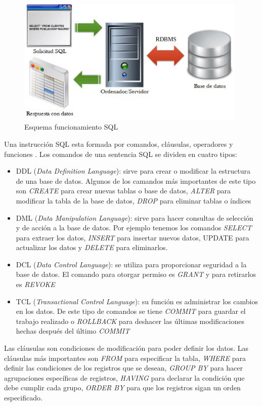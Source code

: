 \begin{figure}[H]
    \centering
    \includegraphics[width=11cm, keepaspectratio]{img/sql.png}
    \caption{Esquema funcionamiento SQL}
    \label{fig:sql}
\end{figure}
Una instrucción SQL esta formada por comandos, cláusulas, operadores y funciones . Los comandos de una sentencia SQL se dividen en cuatro tipos:
\begin{itemize}
\item DDL (\textit{Data Definition Language}): sirve para crear o modificar la estructura de una base de datos. Algunos de los camandos más importantes de este tipo son \textit{CREATE }para crear nuevas tablas o base de datos, \textit{ALTER} para modificar la tabla de la base de datos, \textit{DROP} para eliminar tablas o índices 
\item DML (\textit{Data Manipulation Language}): sirve para hacer consultas de selección y de acción a la base de datos. Por ejemplo tenemos los comandos \textit{SELECT} para extraer los datos,\textit{ INSERT} para insertar nuevos datos, UPDATE para actualizar los datos y \textit{DELETE} para eliminarlos.
\item DCL (\textit{Data Control Language}): se utiliza para proporcionar seguridad a la base de datos. El comando para otorgar permiso es \textit{GRANT} y para retirarlos es \textit{REVOKE}
\item TCL (\textit{Transactional Control Language}): su función es administrar los cambios en los datos. De este tipo de comandos se tiene \textit{COMMIT} para guardar el trabajo realizado o \textit{ROLLBACK} para deshacer las últimas modificaciones hechas después del último \textit{COMMIT}
\end{itemize}

Las cláusulas son condiciones de modificación para poder definir los datos. Las cláusulas más importantes son \textit{FROM} para especificar la tabla, \textit{WHERE} para definir las condiciones de los registros que se desean, \textit{GROUP BY} para hacer agrupaciones específicas de registros, \textit{HAVING} para declarar la condición que debe cumplir cada grupo, \textit{ORDER BY} para que los registros sigan un orden especificado.\\

